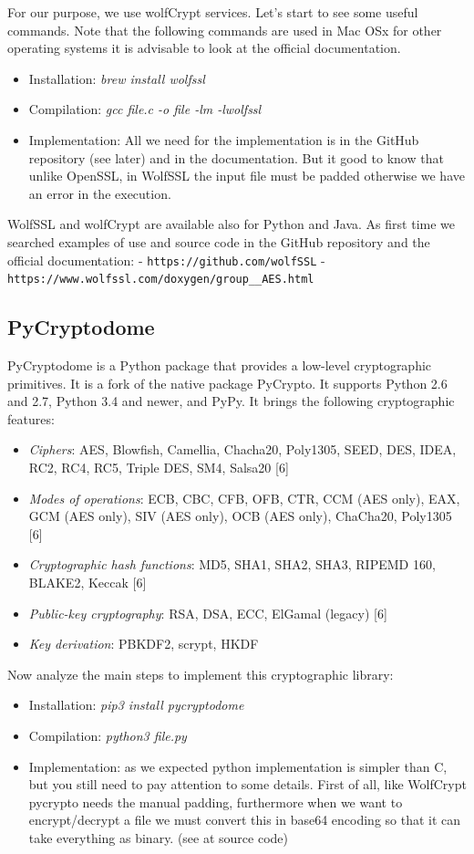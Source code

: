\documentclass[11pt]{article}
\begin{document}
For our purpose, we use wolfCrypt services. Let's start to see some useful commands. Note that the following commands are used in Mac OSx for other operating systems it is advisable to look at the official documentation.
\begin{itemize}
\item Installation: {\em brew install wolfssl}
\item Compilation: {\em gcc file.c -o file -lm -lwolfssl}
\item Implementation: All we need for the implementation is in the GitHub repository (see later) and in the documentation. But it good to know that unlike OpenSSL, in WolfSSL the input file must be padded otherwise we have an error in the execution.
\end{itemize}

WolfSSL and wolfCrypt are available also for Python and Java. As first time we searched examples of use and source code in the GitHub repository and the official documentation:\newline
- \verb|https://github.com/wolfSSL|\newline
- \verb|https://www.wolfssl.com/doxygen/group__AES.html|

\subsection{PyCryptodome}
PyCryptodome is a Python package that provides a low-level cryptographic primitives. It is a fork of the native package PyCrypto. It supports Python 2.6 and 2.7, Python 3.4 and newer, and PyPy. It brings the following cryptographic features:

\begin{itemize}
 \item {\em Ciphers}: AES, Blowfish, Camellia, Chacha20, Poly1305, SEED, DES, IDEA, RC2, RC4, RC5, Triple DES, SM4, Salsa20 [6]
 \item {\em Modes of operations}: ECB, CBC, CFB, OFB, CTR, CCM (AES only), EAX, GCM (AES only), SIV (AES only), OCB (AES only), ChaCha20, Poly1305 [6]
 \item {\em Cryptographic hash functions}: MD5, SHA1, SHA2, SHA3, RIPEMD 160, BLAKE2, Keccak [6]
 \item {\em Public-key cryptography}: RSA, DSA, ECC, ElGamal (legacy) [6]
 \item {\em Key derivation}: PBKDF2, scrypt, HKDF
\end{itemize}

Now analyze the main steps to implement this cryptographic library:
\begin{itemize}
\item Installation: {\em pip3 install pycryptodome}
\item Compilation: {\em python3 file.py}
\item Implementation: as we expected python implementation is simpler than C, but you still need to pay attention to some details. First of all, like WolfCrypt pycrypto needs the manual padding, furthermore when we want to encrypt/decrypt a file we must convert this in base64 encoding so that it can take everything as binary. (see at source code)
\end{itemize}
\end{document}
